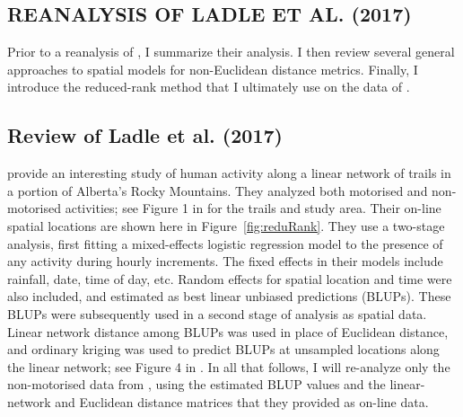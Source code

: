 \documentclass[11pt, titlepage]{article}\usepackage[]{graphicx}\usepackage[]{color}
\begin{document}
\begin{spacing}{1.9}
\begin{flushleft}




\section*{REANALYSIS OF LADLE ET AL. (2017)}

Prior to a reanalysis of \citet{Ladl:Avga:Whea:Boyc:pred:2016}, I summarize their analysis.  I then review several general approaches to spatial models for non-Euclidean distance metrics. Finally, I introduce the reduced-rank method that I ultimately use on the data of \citet{Ladl:Avga:Whea:Boyc:pred:2016}.

\subsection*{Review of Ladle et al. (2017)}

\citet{Ladl:Avga:Whea:Boyc:pred:2016} provide an interesting study of human activity along a linear network of trails in a portion of Alberta's Rocky Mountains.  They analyzed both motorised and non-motorised activities; see Figure 1 in \citet{Ladl:Avga:Whea:Boyc:pred:2016} for the trails and study area. Their on-line spatial locations are shown here in Figure~\ref{fig:reduRank}.  They use a two-stage analysis, first fitting a mixed-effects logistic regression model to the presence of any activity during hourly increments.  The fixed effects in their models include rainfall, date, time of day, etc.  Random effects for spatial location and time were also included, and estimated as best linear unbiased predictions (BLUPs). These BLUPs were subsequently used in a second stage of analysis as spatial data.  Linear network distance among BLUPs was used in place of Euclidean distance, and ordinary kriging was used to predict BLUPs at unsampled locations along the linear network; see Figure 4 in \citet{Ladl:Avga:Whea:Boyc:pred:2016}. In all that follows, I will re-analyze only the non-motorised data from \citet{Ladl:Avga:Whea:Boyc:pred:2016}, using the estimated BLUP values and the linear-network and Euclidean distance matrices that they provided as on-line data. 


\end{flushleft}
\end{spacing}
\end{document}

